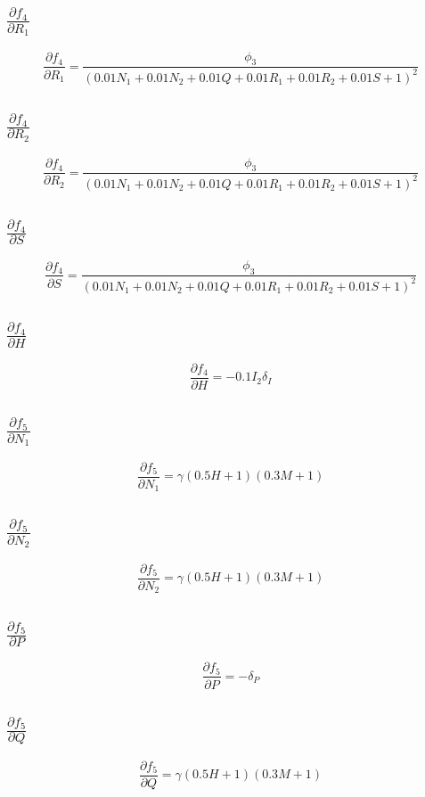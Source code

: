 \documentclass{article}
\begin{document}
\subsection{$\frac{\partial f_{4}}{\partial R_1}$}
\[
\frac{\partial f_{4}}{\partial R_1} = \frac{\phi_{3}}{\left(0.01 N_{1} + 0.01 N_{2} + 0.01 Q + 0.01 R_{1} + 0.01 R_{2} + 0.01 S + 1\right)^{2}}
\]

\subsection{$\frac{\partial f_{4}}{\partial R_2}$}
\[
\frac{\partial f_{4}}{\partial R_2} = \frac{\phi_{3}}{\left(0.01 N_{1} + 0.01 N_{2} + 0.01 Q + 0.01 R_{1} + 0.01 R_{2} + 0.01 S + 1\right)^{2}}
\]

\subsection{$\frac{\partial f_{4}}{\partial S}$}
\[
\frac{\partial f_{4}}{\partial S} = \frac{\phi_{3}}{\left(0.01 N_{1} + 0.01 N_{2} + 0.01 Q + 0.01 R_{1} + 0.01 R_{2} + 0.01 S + 1\right)^{2}}
\]

\subsection{$\frac{\partial f_{4}}{\partial H}$}
\[
\frac{\partial f_{4}}{\partial H} = - 0.1 I_{2} \delta_{I}
\]

\subsection{$\frac{\partial f_{5}}{\partial N_1}$}
\[
\frac{\partial f_{5}}{\partial N_1} = \gamma \left(0.5 H + 1\right) \left(0.3 M + 1\right)
\]

\subsection{$\frac{\partial f_{5}}{\partial N_2}$}
\[
\frac{\partial f_{5}}{\partial N_2} = \gamma \left(0.5 H + 1\right) \left(0.3 M + 1\right)
\]

\subsection{$\frac{\partial f_{5}}{\partial P}$}
\[
\frac{\partial f_{5}}{\partial P} = - \delta_{P}
\]

\subsection{$\frac{\partial f_{5}}{\partial Q}$}
\[
\frac{\partial f_{5}}{\partial Q} = \gamma \left(0.5 H + 1\right) \left(0.3 M + 1\right)
\]
\end{document}
